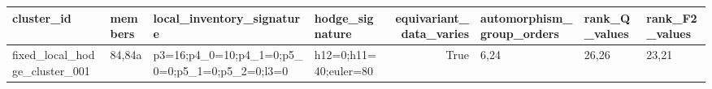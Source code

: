 \begin{tabular}{llllrlll}
\toprule
cluster_id & members & local_inventory_signature & hodge_signature & equivariant_data_varies & automorphism_group_orders & rank_Q_values & rank_F2_values \\
\midrule
fixed_local_hodge_cluster_001 & 84,84a & p3=16;p4_0=10;p4_1=0;p5_0=0;p5_1=0;p5_2=0;l3=0 & h12=0;h11=40;euler=80 & True & 6,24 & 26,26 & 23,21 \\
\bottomrule
\end{tabular}
